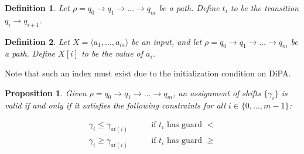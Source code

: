 \documentclass{article}
\newtheorem{proposition}{Proposition}[section]
\newtheorem{definition}{Definition}[section]
\newcommand{\1}{\langle 1 \rangle}
\newcommand{\2}{\langle 2 \rangle}
\begin{document}
\begin{definition}
    Let $\rho = q_0 \to q_1 \to \dots \to q_m$ be a path. Define $t_i$ to be the transition $q_i \to q_{i + 1}$.
\end{definition}

\begin{definition}
    Let $X = \langle a_1, \dots, a_m \rangle$ be an input, and let $\rho = q_0 \to q_1 \to \dots \to q_m$ be a path. Define $X[i]$ to be the value of $a_i$.
\end{definition}

Note that such an index must exist due to the initialization condition on DiPA. 

\begin{proposition}
    Given $\rho = q_0 \to q_1 \to \dots \to q_m$, an assignment of shifts $\{\gamma_i\}$ is valid if and only if it satisfies the following constraints for all $i \in \{0, \dots, m - 1\}$:

    \begin{align*}
        \gamma_i \leq \gamma_{at(i)} \qquad &\text{if } t_i \text{ has guard } < \\
        \gamma_i \geq \gamma_{at(i)} \qquad &\text{if } t_i \text{ has guard } \geq \\
    \end{align*}
\end{proposition}
\end{document}
